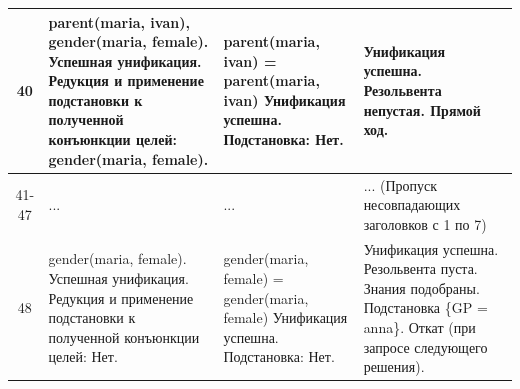 \begin{tabularx}{\textwidth}{|c|>{\small}X|>{\small}X|>{\small}X|}
	40                                                                                 &
	parent(maria, ivan), \newline
	gender(maria, female). \newline
	Успешная унификация. \newline
	Редукция и применение подстановки к полученной конъюнкции целей: \newline
	gender(maria, female).                                                             &
	parent(maria, ivan) = \newline
	parent(maria, ivan) \newline
	Унификация успешна. \newline
	Подстановка: \newline
	Нет.                                                                               &
	Унификация успешна. \newline
	Резольвента непустая. \newline
	Прямой ход.                                                                                  \\
	\hline

	41-47                                                                              &
	...                                                                                &
	...                                                                                &
	... (Пропуск несовпадающих заголовков с 1 по 7)                                              \\
	\hline

	48                                                                                 &
	gender(maria, female). \newline
	Успешная унификация. \newline
	Редукция и применение подстановки к полученной конъюнкции целей: \newline
	Нет.                                                                               &
	gender(maria, female) = \newline
	gender(maria, female) \newline
	Унификация успешна. \newline
	Подстановка: \newline
	Нет.                                                                               &
	Унификация успешна. \newline
	Резольвента пуста. \newline
	Знания подобраны. Подстановка \{GP = anna\}. \newline
	Откат (при запросе следующего решения).                                                      \\
	\hline
\end{tabularx}

